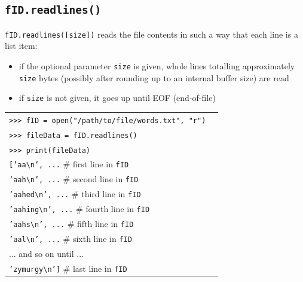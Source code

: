 \documentclass[t,handout,9pt]{beamer}
\begin{document}
\subsection{\texttt{fID.readlines()}}
\begin{frame}
\vfill
\texttt{fID.readlines([size])} reads the file contents in such a way that each line is a list item:
\begin{itemize}
	\item if the optional parameter \texttt{size} is given, whole lines totalling approximately \texttt{size} bytes (possibly after rounding up to an internal buffer size) are read
	\item if \texttt{size} is not given, it goes up until EOF (end-of-file)
\end{itemize}
\begin{table}[]
\begin{flushleft}
\begin{tabular}{ll}
\texttt{>{}>{}> fID = open("/path/to/file/words.txt", "r")} &  \\
\texttt{>{}>{}> fileData = fID.readlines()} &  \\
\texttt{>{}>{}> print(fileData)} &  \\
\texttt{['aa\textbackslash n', ...} \hfill \# first line in \texttt{fID} &\\
\texttt{'aah\textbackslash n', ...} \hfill \# second line in \texttt{fID} &\\
\texttt{'aahed\textbackslash n', ...} \hfill \# third line in \texttt{fID} &\\
\texttt{'aahing\textbackslash n', ...} \hfill \# fourth line in \texttt{fID} &\\
\texttt{'aahs\textbackslash n', ...} \hfill \# fifth line in \texttt{fID} &\\
\texttt{'aal\textbackslash n', ...} \hfill \# sixth line in \texttt{fID} &\\
... and so on until ... &\\
\texttt{'zymurgy\textbackslash n']} \hfill \# last line in \texttt{fID} &\\
\end{tabular}
\end{flushleft}
\end{table}
\vfill
\end{frame}
%
\end{document}
